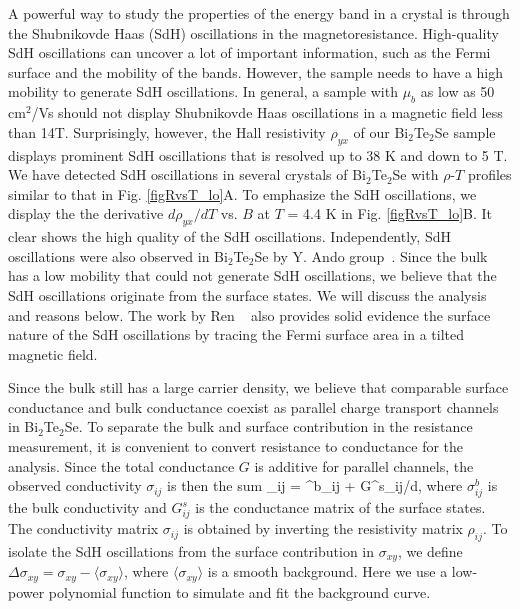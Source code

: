 A powerful way to study the properties of the energy band in a crystal is through the Shubnikovde Haas (SdH) oscillations in the magnetoresistance. High-quality SdH oscillations can uncover a lot of important information, such as the Fermi surface and the mobility of the bands. However, the sample needs to have a high mobility to generate SdH oscillations. In general, a sample with $\mu_b$ as low as 50 cm$^2$/Vs should not display Shubnikovde Haas oscillations in a magnetic field less than 14T. Surprisingly, however, the Hall resistivity $\rho_{yx}$ of our Bi$_2$Te$_2$Se sample displays prominent SdH oscillations that is resolved up to 38 K and down to 5 T. We have detected SdH oscillations in several crystals of Bi$_2$Te$_2$Se with $\rho$-$T$ profiles similar to that in Fig. \ref{figRvsT_lo}A. To emphasize the SdH oscillations, we display the the derivative $d\rho_{yx}/dT$ vs. $B$ at $T$ = 4.4 K in Fig. \ref{figRvsT_lo}B. It clear shows the high quality of the SdH oscillations. Independently, SdH oscillations were also observed in Bi$_2$Te$_2$Se by Y. Ando group~\cite{Ando10}. Since the bulk has a low mobility that could not generate SdH oscillations, we believe that the SdH oscillations originate from the surface states. We will discuss the analysis and reasons below. The work by Ren \etal~\cite{Ando10} also provides solid evidence the surface nature of the SdH oscillations by tracing the Fermi surface area in a tilted magnetic field.

Since the bulk still has a large carrier density, we believe that comparable surface conductance and bulk conductance coexist as parallel charge transport channels in Bi$_2$Te$_2$Se. To separate the bulk and surface contribution in the resistance measurement, it is convenient to convert resistance to conductance for the analysis. Since the total conductance $G$ is additive for parallel channels, the observed conductivity $\sigma_{ij}$ is
then the sum
\be
\sigma_{ij} = \sigma^b_{ij} + G^s_{ij}/d,
\label{eq:sigma}
\ee
where $\sigma^b_{ij}$ is the bulk conductivity and $G^s_{ij}$ is the conductance matrix of the surface states. The conductivity matrix $\sigma_{ij}$ is obtained by inverting the resistivity matrix $\rho_{ij}$. To isolate the SdH oscillations from the surface contribution in $\sigma_{xy}$, we define 
$\Delta\sigma_{xy} = \sigma_{xy} - \langle\sigma_{xy}\rangle$, where $\langle\sigma_{xy}\rangle$ is a smooth background. Here we use a low-power polynomial function to simulate and fit the background curve.




